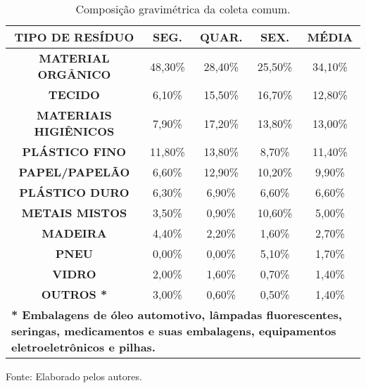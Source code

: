 \begin{table}[htbp]
\caption{Composição gravimétrica da coleta comum.}
\begin{center}
\begin{tabular}{|c|c|c|c|c|}
\hline
\textbf{TIPO DE RESÍDUO} & \textbf{SEG.} & \textbf{QUAR.} & \textbf{SEX.} & \textbf{MÉDIA} \\ \hline
\textbf{MATERIAL ORGÂNICO} & 48,30\% & 28,40\% & 25,50\% & 34,10\% \\ \hline
\textbf{TECIDO} & 6,10\% & 15,50\% & 16,70\% & 12,80\% \\ \hline
\textbf{MATERIAIS HIGIÊNICOS} & 7,90\% & 17,20\% & 13,80\% & 13,00\% \\ \hline
\textbf{PLÁSTICO FINO } & 11,80\% & 13,80\% & 8,70\% & 11,40\% \\ \hline
\textbf{PAPEL/PAPELÃO } & 6,60\% & 12,90\% & 10,20\% & 9,90\% \\ \hline
\textbf{PLÁSTICO DURO } & 6,30\% & 6,90\% & 6,60\% & 6,60\% \\ \hline
\textbf{METAIS MISTOS} & 3,50\% & 0,90\% & 10,60\% & 5,00\% \\ \hline
\textbf{MADEIRA} & 4,40\% & 2,20\% & 1,60\% & 2,70\% \\ \hline
\textbf{PNEU} & 0,00\% & 0,00\% & 5,10\% & 1,70\% \\ \hline
\textbf{VIDRO } & 2,00\% & 1,60\% & 0,70\% & 1,40\% \\ \hline
\textbf{OUTROS *} & 3,00\% & 0,60\% & 0,50\% & 1,40\% \\ \hline
\multicolumn{ 5}{|l|}{\textbf{* Embalagens de óleo automotivo, lâmpadas fluorescentes, seringas, medicamentos e suas embalagens, equipamentos eletroeletrônicos e pilhas.}} \\ \hline
\end{tabular}
\end{center}
\label{tab:gravimetrica}
Fonte: Elaborado pelos autores.
\end{table}
